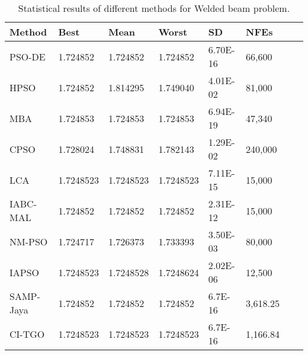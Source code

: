 
\begin{table*}[tp]
    \tiny
\begin{center}

\begin{tabular}{ P{2.0cm} P{2.0cm} P{2.0cm} P{2.0cm} P{2.0cm} P{2.0cm} P{2.0cm} P{2.0cm}  }
\hline
\textbf{Method} & \textbf{Best} & \textbf{Mean} & \textbf{Worst} & \textbf{SD} & \textbf{NFEs} \\
\hline
PSO-DE & 1.724852 & 1.724852 & 1.724852 & 6.70E-16 & 66,600 \\
HPSO & 1.724852 & 1.814295 & 1.749040 & 4.01E-02 & 81,000 \\
MBA & 1.724853 & 1.724853 & 1.724853 & 6.94E-19 & 47,340 \\
CPSO & 1.728024 & 1.748831 & 1.782143 & 1.29E-02 & 240,000 \\
LCA & 1.7248523 & 1.7248523 & 1.7248523 & 7.11E-15 & 15,000 \\
IABC-MAL & 1.724852 & 1.724852 & 1.724852 & 2.31E-12 & 15,000 \\
NM-PSO & 1.724717 & 1.726373 & 1.733393 & 3.50E-03 & 80,000 \\
IAPSO & 1.7248523 & 1.7248528 & 1.7248624 & 2.02E-06 & 12,500 \\
SAMP-Jaya & 1.724852 & 1.724852 & 1.724852 & 6.7E-16 & 3,618.25 \\
CI-TGO & 1.7248523 & 1.7248523 & 1.7248523 & 6.7E-16 & 1,166.84 \\


\hline
\end{tabular}
\end{center}

\caption{ Statistical results of different methods for Welded beam problem. \\[1em]}
\label{tab:WB}
\end{table*}

